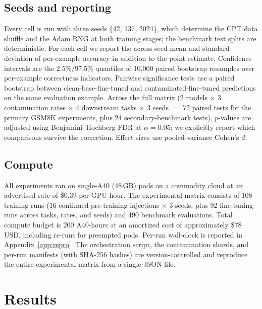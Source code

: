 \documentclass{article}
\newcommand{\resnum}[1]{#1}
\begin{document}
\subsection{Seeds and reporting}
Every cell is run with three seeds \{42, 137, 2024\}, which determine the CPT data shuffle and the Adam RNG at both training stages; the benchmark test splits are deterministic. For each cell we report the across-seed mean and standard deviation of per-example accuracy in addition to the point estimate. Confidence intervals are the 2.5\%/97.5\% quantiles of 10{,}000 paired bootstrap resamples over per-example correctness indicators. Pairwise significance tests use a paired bootstrap between clean-base-fine-tuned and contaminated-fine-tuned predictions on the same evaluation example. Across the full matrix (2 models $\times$ 3 contamination rates $\times$ 4 downstream tasks $\times$ 3 seeds $=$ 72 paired tests for the primary GSM8K experiments, plus 24 secondary-benchmark tests), $p$-values are adjusted using Benjamini--Hochberg FDR at $\alpha = 0.05$; we explicitly report which comparisons survive the correction. Effect sizes use pooled-variance Cohen's $d$.

\subsection{Compute}
All experiments ran on single-A40 (48\,GB) pods on a commodity cloud at an advertised rate of \$0.39 per GPU-hour. The experimental matrix consists of \resnum{108} training runs (16 continued-pre-training injections $\times$ 3 seeds, plus 92 fine-tuning runs across tasks, rates, and seeds) and \resnum{490} benchmark evaluations. Total compute budget is \resnum{200} A40-hours at an amortized cost of approximately \resnum{\$78}\,USD, including re-runs for preempted pods. Per-run wall-clock is reported in Appendix~\ref{app:repro}. The orchestration script, the contamination shards, and per-run manifests (with SHA-256 hashes) are version-controlled and reproduce the entire experimental matrix from a single JSON file.

\section{Results}
\label{sec:results}
\end{document}
